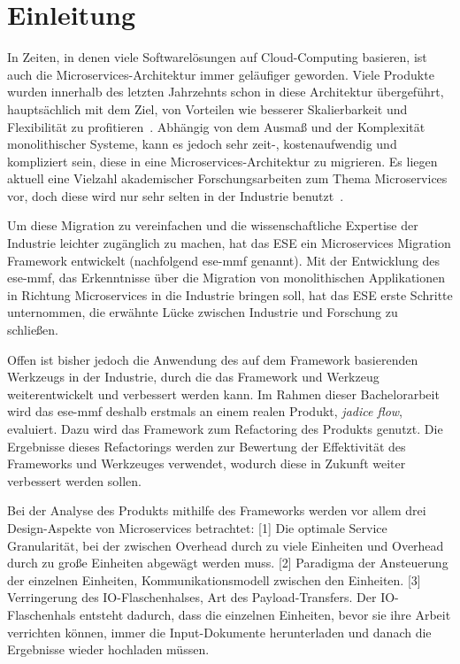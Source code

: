 \chapter{Einleitung}
\label{chap:einleitung}

In Zeiten, in denen viele Softwarelösungen auf Cloud-Computing basieren, ist auch die Microservices-Architektur immer geläufiger geworden.
Viele Produkte wurden innerhalb des letzten Jahrzehnts schon in diese Architektur übergeführt, hauptsächlich mit dem Ziel, von Vorteilen wie besserer Skalierbarkeit und Flexibilität zu profitieren~\cite{Fritzsch_2019}.
Abhängig von dem Ausmaß und der Komplexität monolithischer Systeme, kann es jedoch sehr zeit-, kostenaufwendig und kompliziert sein, diese in eine Microservices-Architektur zu migrieren.
Es liegen aktuell eine Vielzahl akademischer Forschungsarbeiten zum Thema Microservices vor, doch diese wird nur sehr selten in der Industrie benutzt~\cite{fritzsch2022architecturecentric}.

Um diese Migration zu vereinfachen und die wissenschaftliche Expertise der Industrie leichter zugänglich zu machen, hat das ESE ein Microservices Migration Framework entwickelt (nachfolgend \acrshort{ese-mmf} genannt).
Mit der Entwicklung des \acrshort{ese-mmf}, das Erkenntnisse über die Migration von monolithischen Applikationen in Richtung Microservices in die Industrie bringen soll, hat das ESE erste Schritte unternommen, die erwähnte Lücke zwischen Industrie und Forschung zu schließen.

Offen ist bisher jedoch die Anwendung des auf dem Framework basierenden Werkzeugs in der Industrie, durch die das Framework und Werkzeug weiterentwickelt und verbessert werden kann.
Im Rahmen dieser Bachelorarbeit wird das \acrshort{ese-mmf} deshalb erstmals an einem realen Produkt, \emph{jadice flow}, evaluiert.
Dazu wird das Framework zum Refactoring des Produkts genutzt.
Die Ergebnisse dieses Refactorings werden zur Bewertung der Effektivität des Frameworks und Werkzeuges verwendet, wodurch diese in Zukunft weiter verbessert werden sollen.

Bei der Analyse des Produkts mithilfe des Frameworks werden vor allem drei Design-Aspekte von Microservices betrachtet:
[1] Die optimale Service Granularität, bei der zwischen Overhead durch zu viele Einheiten und Overhead durch zu große Einheiten abgewägt werden muss.
[2] Paradigma der Ansteuerung der einzelnen Einheiten, Kommunikationsmodell zwischen den Einheiten.
[3] Verringerung des IO-Flaschenhalses, Art des Payload-Transfers.
Der IO-Flaschenhals entsteht dadurch, dass die einzelnen Einheiten, bevor sie ihre Arbeit verrichten können, immer die Input-Dokumente herunterladen und danach die Ergebnisse wieder hochladen müssen.


